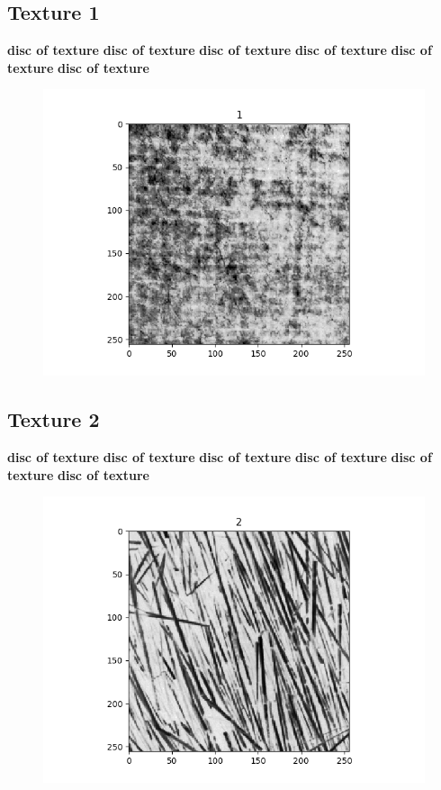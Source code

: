 \documentclass{article}
\begin{document}
\newpage
\subsection{Texture 1}
\textbf{disc of texture}
\textbf{disc of texture}
\textbf{disc of texture}
\textbf{disc of texture}
\textbf{disc of texture}
\textbf{disc of texture}
\begin{figure}[h!]
\includegraphics[scale=0.5]{1.png}
\end{figure}


\subsection{Texture 2}
\textbf{disc of texture}
\textbf{disc of texture}
\textbf{disc of texture}
\textbf{disc of texture}
\textbf{disc of texture}
\textbf{disc of texture}
\begin{figure}[h!]
\includegraphics[scale=0.5]{2.png}
\end{figure}
\newpage
\end{document}
